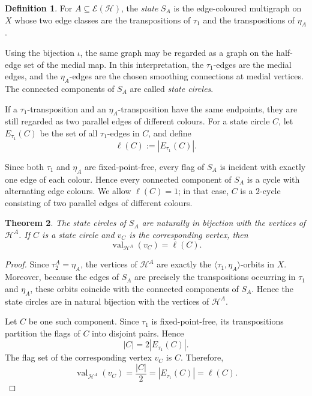 \documentclass[10pt,a4paper]{article}
\newtheorem{theorem}{Theorem}[section]
\theoremstyle{definition}
\newtheorem{definition}[theorem]{Definition}
\theoremstyle{remark}
\newcommand{\Hcal}{\mathcal{H}}
\newcommand{\Ecal}{\mathcal{E}}
\newcommand{\val}{\operatorname{val}}
\begin{document}
\begin{definition}\label{def:state}
For $A\subseteq\Ecal(\Hcal)$, the \emph{state} $S_A$ is the edge-coloured
multigraph on $X$ whose two edge classes are the transpositions of
$\tau_1$ and the transpositions of $\eta_A$.

Using the bijection $\iota$, the same graph may be regarded as a graph on the
half-edge set of the medial map. In this interpretation, the $\tau_1$-edges
are the medial edges, and the $\eta_A$-edges are the chosen smoothing
connections at medial vertices. The connected components of $S_A$ are
called \emph{state circles}.

If a $\tau_1$-transposition and an $\eta_A$-transposition have the same
endpoints, they are still regarded as two parallel edges of different
colours. For a state circle $C$, let $E_{\tau_1}(C)$ be the set of all
$\tau_1$-edges in $C$, and define
\[
 \ell(C):=\left|E_{\tau_1}(C)\right|.
\]
\end{definition}

Since both $\tau_1$ and $\eta_A$ are fixed-point-free, every flag of $S_A$
is incident with exactly one edge of each colour. Hence every connected
component of $S_A$ is a cycle with alternating edge colours. We allow
$\ell(C)=1$; in that case, $C$ is a $2$-cycle consisting of two parallel
edges of different colours.

\begin{theorem}\label{thm:state-vertices}
The state circles of $S_A$ are naturally in bijection with the vertices of
$\Hcal^A$. If $C$ is a state circle and $v_C$ is the corresponding vertex,
then
\[
 \val_{\Hcal^A}(v_C)=\ell(C).
\]
\end{theorem}

\begin{proof}
Since $\tau_2^A=\eta_A$, the vertices of $\Hcal^A$ are exactly the $\langle\tau_1,\eta_A\rangle$-orbits in $X$. Moreover, because the edges of $S_A$ are precisely the transpositions occurring in $\tau_1$ and $\eta_A$, these orbits coincide with the connected components of $S_A$. Hence the state circles are in natural bijection with the vertices of $\Hcal^A$.

Let $C$ be one such component. Since $\tau_1$ is fixed-point-free, its
transpositions partition the flags of $C$ into disjoint pairs. Hence
\[
 |C|=2\left|E_{\tau_1}(C)\right|.
\]
The flag set of the corresponding vertex $v_C$ is $C$. Therefore,
\[
 \val_{\Hcal^A}(v_C)
 =\frac{|C|}{2}
 =\left|E_{\tau_1}(C)\right|
 =\ell(C).
\]
\end{proof}
\end{document}

